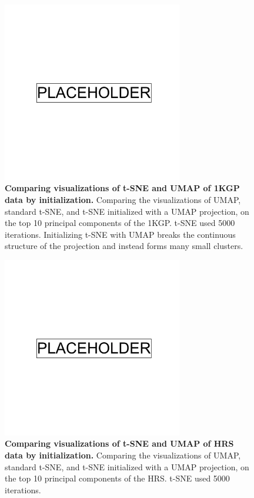 \begin{figure}[!htb]
    \centering
    \includegraphics[width=0.7\textwidth]{placeholder.png}
    \caption[Comparing visualizations of t-SNE and UMAP of 1KGP data by initialization]{\textbf{Comparing visualizations of t-SNE and UMAP of 1KGP data by initialization.} Comparing the visualizations of UMAP, standard t-SNE, and t-SNE initialized with a UMAP projection, on the top 10 principal components of the 1KGP. t-SNE used 5000 iterations. Initializing t-SNE with UMAP breaks the continuous structure of the projection and instead forms many small clusters.}
    \label{fig:supp_tsne_umap_compare_1kgp}
\end{figure}

\newpage

\begin{figure}[!htb]
    \centering
    \includegraphics[width=0.7\textwidth]{placeholder.png}
    \caption[Comparing visualizations of t-SNE and UMAP of HRS data by initialization]{\textbf{Comparing visualizations of t-SNE and UMAP of HRS data by initialization.} Comparing the visualizations of UMAP, standard t-SNE, and t-SNE initialized with a UMAP projection, on the top 10 principal components of the HRS. t-SNE used 5000 iterations.}
    \label{fig:supp_tsne_umap_compare_hrs}
\end{figure}

